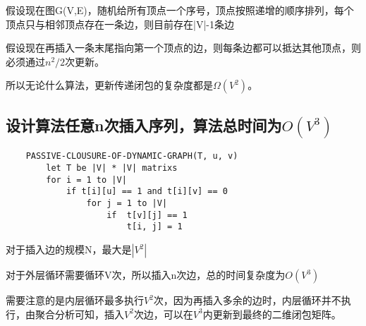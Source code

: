 \documentclass[UTF8]{ctexart}
\begin{document}
 假设现在图G(V,E)，随机给所有顶点一个序号，顶点按照递增的顺序排列，每个顶点只与相邻顶点存在一条边，则目前存在|V|-1条边

 假设现在再插入一条末尾指向第一个顶点的边，则每条边都可以抵达其他顶点，则必须通过$n^2 / 2$次更新。

 所以无论什么算法，更新传递闭包的复杂度都是$\Omega(V^2)$。

 \subsection{设计算法任意n次插入序列，算法总时间为$O(V^3)$}

 \begin{lstlisting}
    PASSIVE-CLOUSURE-OF-DYNAMIC-GRAPH(T, u, v)
        let T be |V| * |V| matrixs
        for i = 1 to |V|
            if t[i][u] == 1 and t[i][v] == 0
                for j = 1 to |V|
                    if  t[v][j] == 1 
                        t[i, j] = 1
 \end{lstlisting}

 对于插入边的规模N，最大是$|V^2|$

 对于外层循环需要循环V次，所以插入n次边，总的时间复杂度为$O(V^3)$

 需要注意的是内层循环最多执行$V^2$次，因为再插入多余的边时，内层循环并不执行，由聚合分析可知，插入$V^2$次边，可以在$V^3$内更新到最终的二维闭包矩阵。
\end{document}
